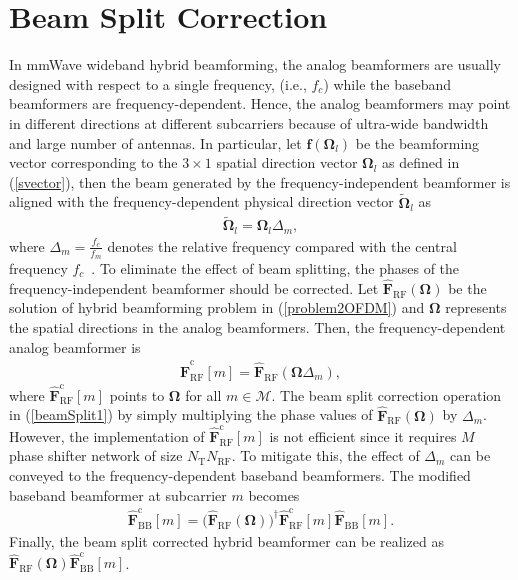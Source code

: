 \documentclass[journal,10pt]{IEEEtran}
\begin{document}
	
	{\color{black}
		\section{Beam Split Correction}
		\label{appBeamsplit}
		In mmWave wideband hybrid beamforming, the analog beamformers are usually designed with respect to a single frequency, (i.e., $f_c$) while the baseband beamformers are frequency-dependent. Hence, the analog beamformers may point in different directions at different subcarriers because of ultra-wide bandwidth and large number of antennas. In particular, let $\mathbf{f}(\mathbf{\Omega}_l)$ be the beamforming vector corresponding to the $3\times 1$ spatial direction vector $\mathbf{\Omega}_l$  as defined in (\ref{svector}), then the beam generated by the frequency-independent beamformer is aligned with the frequency-dependent physical direction vector $\widetilde{\mathbf{\Omega}}_{l}$ as
		\begin{align}
		\widetilde{\mathbf{\Omega}}_{l} = {\mathbf{\Omega}}_{l} \Delta_m,
		\end{align}
		where $\Delta_m = \frac{f_c}{f_m}$ denotes the relative frequency compared with the central frequency $f_c$~\cite{thz_beamSplit}. To eliminate the effect of beam splitting, the phases of the frequency-independent beamformer should be corrected.  Let $\hat{\mathbf{F}}_\mathrm{RF}(\mathbf{\Omega})$  be the solution of hybrid beamforming problem in (\ref{problem2OFDM}) and $\mathbf{\Omega}$ represents the spatial directions in the analog beamformers. Then, the frequency-dependent analog beamformer is
		\begin{align}
		\label{beamSplit1}
		\hat{\mathbf{F}}_\mathrm{RF}^\mathrm{c}[m] = \hat{\mathbf{F}}_\mathrm{RF}(\mathbf{\Omega} \Delta_m),
		\end{align}
		where $\hat{\mathbf{F}}_\mathrm{RF}^\mathrm{c}[m]$ points to $\mathbf{\Omega}$ for all $m\in\mathcal{M}$. The beam split correction operation in (\ref{beamSplit1}) by simply multiplying the phase values of $\hat{\mathbf{F}}_\mathrm{RF}(\mathbf{\Omega})$ by $\Delta_m$. However, the implementation of $\hat{\mathbf{F}}_\mathrm{RF}^\mathrm{c}[m]$ is not efficient since it requires $M$ phase shifter network of size $N_\mathrm{T}N_\mathrm{RF}$. To mitigate this, the effect of $\Delta_m$ can be conveyed to the frequency-dependent baseband beamformers. The modified baseband beamformer at subcarrier $m$ becomes
		\begin{align}
		\label{beamSplitEquation}
		\hat{\mathbf{F}}_\mathrm{BB}^\mathrm{c}[m] = \big(\hat{\mathbf{F}}_\mathrm{RF}(\mathbf{\Omega})\big)^\dagger  \hat{\mathbf{F}}_\mathrm{RF}^\mathrm{c}[m] \hat{\mathbf{F}}_\mathrm{BB}[m].
		\end{align}
		Finally,  the beam split corrected hybrid beamformer can be realized as $\hat{\mathbf{F}}_\mathrm{RF}(\mathbf{\Omega})\hat{\mathbf{F}}_\mathrm{BB}^\mathrm{c}[m]$.
		
	}
	
\end{document}
